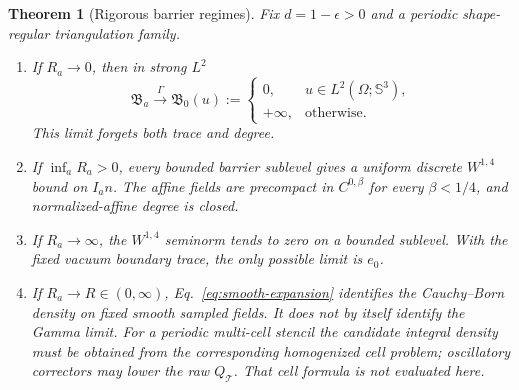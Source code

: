 \documentclass[11pt]{article}
\numberwithin{equation}{section}
\newtheorem{theorem}{Theorem}[section]
\theoremstyle{definition}
\theoremstyle{remark}
\newcommand{\SSS}{\mathbb S}
\newcommand{\cT}{\mathcal T}
\newcommand{\ezer}{e_0}
\begin{document}
\begin{theorem}[Rigorous barrier regimes]
Fix $d=1-\epsilon>0$ and a periodic shape-regular triangulation family.

\begin{enumerate}[label=(\roman*)]
\item If $R_a\to0$, then in strong $L^2$
\begin{equation}
 \mathfrak B_a\xrightarrow{\Gamma}
 \mathfrak B_0(u):=
 \begin{cases}
 0,&u\in L^2(\Omega;\SSS^3),\\
 +\infty,&\text{otherwise}.
 \end{cases}
 \label{eq:gamma-zero}
\end{equation}
This limit forgets both trace and degree.

\item If $\inf_aR_a>0$, every bounded barrier sublevel gives a uniform
discrete $W^{1,4}$ bound on $I_an$.  The affine fields are precompact in
$C^{0,\beta}$ for every $\beta<1/4$, and normalized-affine degree is closed.

\item If $R_a\to\infty$, the $W^{1,4}$ seminorm tends to zero on a bounded
sublevel.  With the fixed vacuum boundary trace, the only possible limit is
$\ezer$.

\item If $R_a\to R\in(0,\infty)$, Eq.~\eqref{eq:smooth-expansion} identifies
the Cauchy--Born density on fixed smooth sampled fields.  It does not by
itself identify the Gamma limit.  For a periodic multi-cell stencil the
candidate integral density must be obtained from the corresponding
homogenized cell problem; oscillatory correctors may lower the raw
$Q_{\cT}$.  That cell formula is not evaluated here.
\end{enumerate}
\end{theorem}
\end{document}
